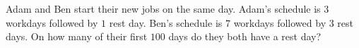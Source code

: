 Adam and Ben start their new jobs on the same day. Adam's schedule is $3$ workdays followed by $1$ rest day. Ben's schedule is $7$ workdays followed by $3$ rest days. On how many of their first $100$ days do they both have a rest day?
